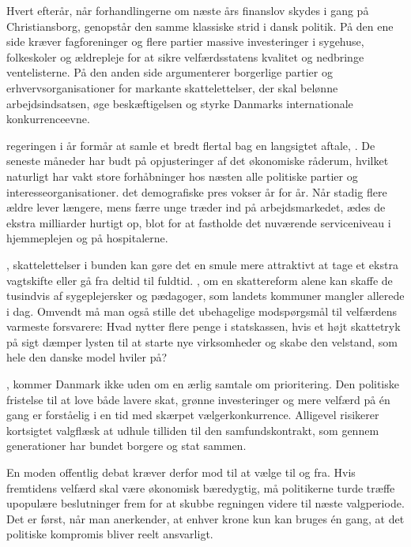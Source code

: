 Hvert efterår, når forhandlingerne om næste års finanslov skydes i gang på Christiansborg, genopstår den samme klassiske strid i dansk politik. På den ene side kræver fagforeninger og flere partier massive investeringer i sygehuse, folkeskoler og ældrepleje for at sikre velfærdsstatens kvalitet og nedbringe ventelisterne. På den anden side argumenterer borgerlige partier og erhvervsorganisationer for markante skattelettelser, der skal belønne arbejdsindsatsen, øge beskæftigelsen og styrke Danmarks internationale konkurrenceevne.

 regeringen i år formår at samle et bredt flertal bag en langsigtet aftale, . De seneste måneder har budt på opjusteringer af det økonomiske råderum, hvilket naturligt har vakt store forhåbninger hos næsten alle politiske partier og interesseorganisationer.  det demografiske pres vokser år for år. Når stadig flere ældre lever længere, mens færre unge træder ind på arbejdsmarkedet, ædes de ekstra milliarder hurtigt op, blot for at fastholde det nuværende serviceniveau i hjemmeplejen og på hospitalerne.

, skattelettelser i bunden kan gøre det en smule mere attraktivt at tage et ekstra vagtskifte eller gå fra deltid til fuldtid. , om en skattereform alene kan skaffe de tusindvis af sygeplejersker og pædagoger, som landets kommuner mangler allerede i dag. Omvendt må man også stille det ubehagelige modspørgsmål til velfærdens varmeste forsvarere: Hvad nytter flere penge i statskassen, hvis et højt skattetryk på sigt dæmper lysten til at starte nye virksomheder og skabe den velstand, som hele den danske model hviler på?

, kommer Danmark ikke uden om en ærlig samtale om prioritering. Den politiske fristelse til at love både lavere skat, grønne investeringer og mere velfærd på én gang er forståelig i en tid med skærpet vælgerkonkurrence. Alligevel risikerer kortsigtet valgflæsk at udhule tilliden til den samfundskontrakt, som gennem generationer har bundet borgere og stat sammen.

En moden offentlig debat kræver derfor mod til at vælge til og fra. Hvis fremtidens velfærd skal være økonomisk bæredygtig, må politikerne turde træffe upopulære beslutninger frem for at skubbe regningen videre til næste valgperiode. Det er først, når man anerkender, at enhver krone kun kan bruges én gang, at det politiske kompromis bliver reelt ansvarligt.

